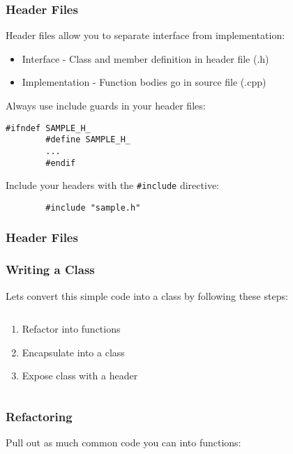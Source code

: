 \begin{frame}[fragile]
	\frametitle{Header Files}
	Header files allow you to separate interface from implementation:
	\begin{itemize}
		\item Interface - Class and member definition in header file (.h)
		\item Implementation - Function bodies go in source file (.cpp)
	\end{itemize}
	\vfill
	Always use include guards in your header files:
	\begin{lstlisting}[title=sample.h]
		#ifndef SAMPLE_H_
		#define SAMPLE_H_
		...
		#endif
	\end{lstlisting}
	\vfill
	Include your headers with the \texttt{\#include} directive:
	\begin{lstlisting}
		#include "sample.h"
	\end{lstlisting}
\end{frame}

\begin{frame}
	\frametitle{Header Files}
	
	
\end{frame}

\begin{frame}[fragile]
	\frametitle{Writing a Class}
	Lets convert this simple code into a class by following these steps:
	\begin{columns}[T]
		\begin{column}{0.5\textwidth}
			\begin{enumerate}
				\item Refactor into functions
				\bigskip
				\item Encapsulate into a class
				\bigskip
				\item Expose class with a header
			\end{enumerate}
		\end{column}
		\begin{column}{0.5\textwidth}
			
		\end{column}
	\end{columns}
\end{frame}

\begin{frame}[fragile]
	\frametitle{Refactoring}
	Pull out as much common code you can into functions:
	\begin{columns}[T]
		\begin{column}{0.5\textwidth}
		\end{column}
		\begin{column}{0.5\textwidth}
			
		\end{column}
	\end{columns}
\end{frame}

